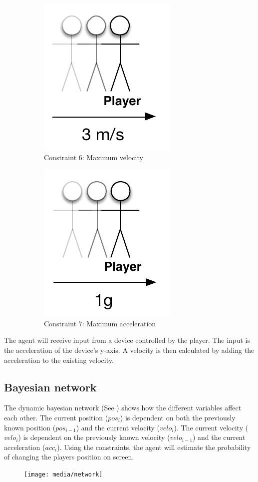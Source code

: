 \begin{figure}[H]
\begin{subfigure}[b]{0.45\textwidth}
		\centering
		\includegraphics[scale = 0.45]{media/constraints/06-maximum-velocity}
		\caption{Constraint 6: Maximum velocity}
		\label{figure:maximum-velocity}
	\end{subfigure}
	\qquad
	\begin{subfigure}[b]{0.45\textwidth}
		\centering
		\includegraphics[scale = 0.45]{media/constraints/07-maximum-acceleration}
		\caption{Constraint 7: Maximum acceleration}
		\label{figure:maximum-acceleration}
	\end{subfigure}		
	\caption{}
	\label{figure:constraints}
\end{figure}




The agent will receive input from a device controlled by the player.
The input is the acceleration of the device's y-axis.
A velocity is then calculated by adding the acceleration to the existing velocity.

\subsection{Bayesian network}
The dynamic bayesian network (See ) shows how the different variables affect each other.
The current position ($pos_i$) is dependent on both the previously known position ($pos_{i-1}$) and the current velocity ($velo_i$).
The current velocity ($velo_i$) is dependent on the previously known velocity ($velo_{i-1}$) and the current acceleration ($acc_i$).
Using the constraints, the agent will estimate the probability of changing the players position on screen.


\begin{figure}[H]
\centering
\texttt{[image: media/network]}
\caption{}
\label{fig:network}
\end{figure}
